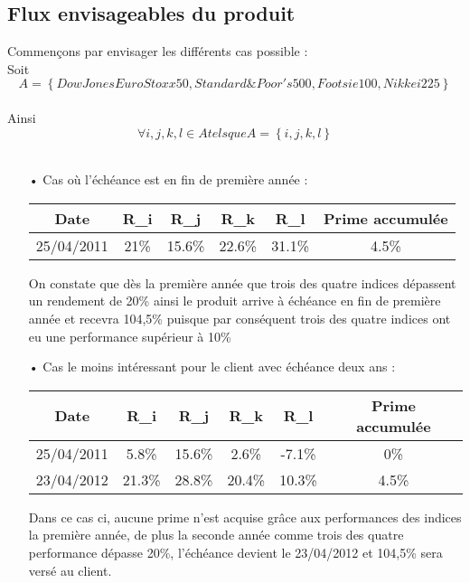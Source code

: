 \documentclass[french,12pt,a4paper]{article}
\begin{document}
\subsection{Flux envisageables du produit}

Commençons par envisager les différents cas possible :\\
Soit $$ A = \left\{ Dow Jones Euro Stoxx 50, Standard \& Poor's 500, Footsie 100, Nikkei 225 \right\}$$\\
Ainsi $$\forall i, j, k, l \in A tels que A = \left\lbrace i, j, k, l \right\rbrace$$\\

\begin{itemize}

\item[•]
Cas où l'échéance est en fin de première année :\\

\begin{center}
\begin{tabular}{|c|c|c|c|c|c|}
  \hline
  Date & R_{i} & R_{j} & R_{k} & R_{l} & Prime accumulée \\
  \hline
  25/04/2011 & 21\% & 15.6\% & 22.6\% & 31.1\% & 4.5\%\\
  \hline
\end{tabular}
\end{center}

On constate que dès la première année que trois des quatre indices dépassent un rendement de 20\% ainsi le produit arrive à échéance en fin de première année et recevra 104,5\% puisque par conséquent trois des quatre indices ont eu une performance supérieur à 10\% \\

\item[•]
Cas le moins intéressant pour le client avec échéance deux ans :\\

\begin{center}
\begin{tabular}{|c|c|c|c|c|c|}
  \hline
  Date & R_{i} & R_{j} & R_{k} & R_{l} & Prime accumulée \\
  \hline
  25/04/2011 & 5.8\% & 15.6\% & 2.6\% & -7.1\% & 0\%\\
  23/04/2012 & 21.3\% & 28.8\% & 20.4\% & 10.3\% & 4.5\%\\
  \hline
\end{tabular}
\end{center}

Dans ce cas ci, aucune prime n'est acquise grâce aux performances des indices la première année, de plus la seconde année comme trois des quatre performance dépasse 20\%, l'échéance devient le 23/04/2012 et 104,5\% sera versé au client.


\end{itemize}
\end{document}
